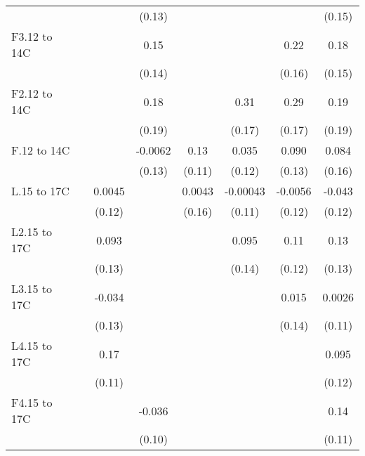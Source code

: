 \documentclass[paper=letterpaper, fontsize=11pt]{article} %
\begin{document}
{\begin{landscape}
\begin{longtable}{l*{7}{c}}
                    &            &            &      (0.13)&            &            &            &      (0.15)\\
F3.12 to 14C        &            &            &        0.15&            &            &        0.22&        0.18\\
                    &            &            &      (0.14)&            &            &      (0.16)&      (0.15)\\
F2.12 to 14C        &            &            &        0.18&            &        0.31&        0.29&        0.19\\
                    &            &            &      (0.19)&            &      (0.17)&      (0.17)&      (0.19)\\
F.12 to 14C         &            &            &     -0.0062&        0.13&       0.035&       0.090&       0.084\\
                    &            &            &      (0.13)&      (0.11)&      (0.12)&      (0.13)&      (0.16)\\
L.15 to 17C         &            &      0.0045&            &      0.0043&    -0.00043&     -0.0056&      -0.043\\
                    &            &      (0.12)&            &      (0.16)&      (0.11)&      (0.12)&      (0.12)\\
L2.15 to 17C        &            &       0.093&            &            &       0.095&        0.11&        0.13\\
                    &            &      (0.13)&            &            &      (0.14)&      (0.12)&      (0.13)\\
L3.15 to 17C        &            &      -0.034&            &            &            &       0.015&      0.0026\\
                    &            &      (0.13)&            &            &            &      (0.14)&      (0.11)\\
L4.15 to 17C        &            &        0.17&            &            &            &            &       0.095\\
                    &            &      (0.11)&            &            &            &            &      (0.12)\\
F4.15 to 17C        &            &            &      -0.036&            &            &            &        0.14\\
                    &            &            &      (0.10)&            &            &            &      (0.11)\\

\end{longtable}
\end{landscape}}
\end{document}
